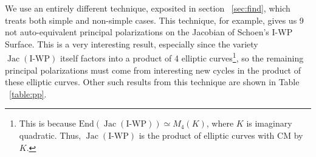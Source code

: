 \documentclass[12pt,reqno]{amsart}
\DeclareMathOperator{\Jac}{Jac}
\newtheorem*{thm*}{Theorem}
\theoremstyle{definition}
\theoremstyle{remark}
\newcommand{\ti}{\todo[inline]}
\begin{document}




We use an entirely different technique, exposited in section ~\ref{sec:find}, which treats both simple and non-simple cases. This technique, for example, gives us 9 not auto-equivalent principal polarizations on the Jacobian of Schoen's I-WP Surface. This is a very interesting result, especially since the variety $\Jac(\text{I-WP})$ itself factors into a product of 4 elliptic curves\footnote{This is because $\text{End}(\Jac(\text{I-WP})) \simeq M_4(K)$, where $K$ is imaginary quadratic. Thus, $\Jac(\text{I-WP})$ is the product of elliptic curves with CM by $K$.}, so the remaining principal polarizations must come from interesting new cycles in the product of these elliptic curves. Other such results from this technique are shown in Table ~\ref{table:pp}.
\end{document}
